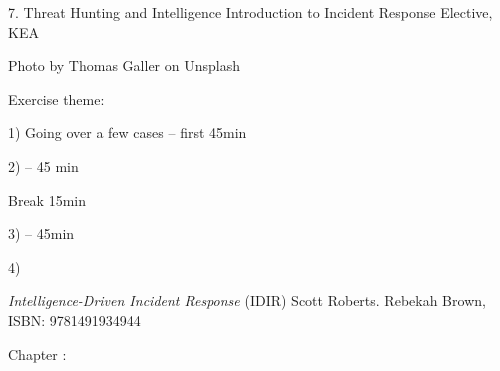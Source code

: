 \documentclass[Screen16to9,17pt]{foils}
\begin{document}
\mytitlepage
{7. Threat Hunting and Intelligence}
{Introduction to Incident Response Elective, KEA}




\begin{list2}
\item
\item
\item
\end{list2}

{\hfill \small Photo by Thomas Galler on Unsplash}


\begin{list2}
\item
\item
\item
\item
\item
\end{list2}

Exercise theme:
\begin{list2}
\item
\item
\item
\end{list2}


\begin{list2}
\item 1) Going over a few cases -- first 45min
\item 2)  -- 45 min
\item Break 15min
\item 3)  -- 45min
\item 4)
\end{list2}



\emph{Intelligence-Driven Incident Response} (IDIR)
 Scott Roberts. Rebekah Brown, ISBN: 9781491934944

\begin{quote}

\end{quote}

\begin{list2}
\item Chapter :
\end{list2}


\end{document}
